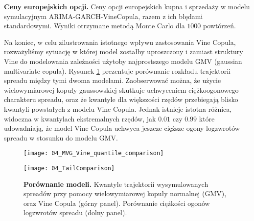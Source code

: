 \begin{table}
	\centering
	
	\caption{\textbf{Ceny europejskich opcji.} Ceny opcji europejskich kupna i sprzedaży w modelu symulacyjnym ARIMA-GARCH-VineCopula, razem z ich błędami standardowymi. Wyniki otrzymane metodą Monte Carlo dla $1000$ powtórzeń. \label{tab:option_prices}}
\end{table}

\FloatBarrier
Na koniec, w celu zilustrowania istotnego wpływu zastosowania Vine Copula, rozważyliśmy sytuację w której model zostałby uproszczony i zamiast struktury Vine do modelowania zależności użytoby najprostszego modelu GMV (gaussian multivariate copula). Rysunek \ref{fig:model_comparison} prezentuje porównanie rozkładu trajektorii spreadu między tymi dwoma modelami. Zaobserwować można, że użycie wielowymiarowej kopuły gaussowskiej skutkuje uchwyceniem ciężkoogonowego charakteru spreadu, oraz że kwantyle dla większości rzędów przebiegają blisko kwantyli powstałych z modelu Vine Copula. Jednak istnieje istotna różnica, widoczna w kwantylach ekstremalnych rzędów, jak $0.01$ czy $0.99$ które udowadniają, że model Vine Copula uchwyca jeszcze cięższe ogony logzwrotów spreadu w stosunku do modelu GMV.
	
\begin{figure}[h]
	\centering
	\begin{minipage}{\linewidth}
	\centering
	\texttt{[image: 04\_MVG\_Vine\_quantile\_comparison]}
	\end{minipage}

	\begin{minipage}{\linewidth}
	\centering
	\texttt{[image: 04\_TailComparison]}
	\end{minipage}

	\caption{\textbf{Porównanie modeli.} Kwantyle trajektorii wysymulowanych spreadów przy pomocy wielowymiarowej kopuły normalnej (GMV), oraz Vine Copula (górny panel). Porównanie ciężkości ogonów logzwrotów spreadu (dolny panel).\label{fig:model_comparison}}

\end{figure}

